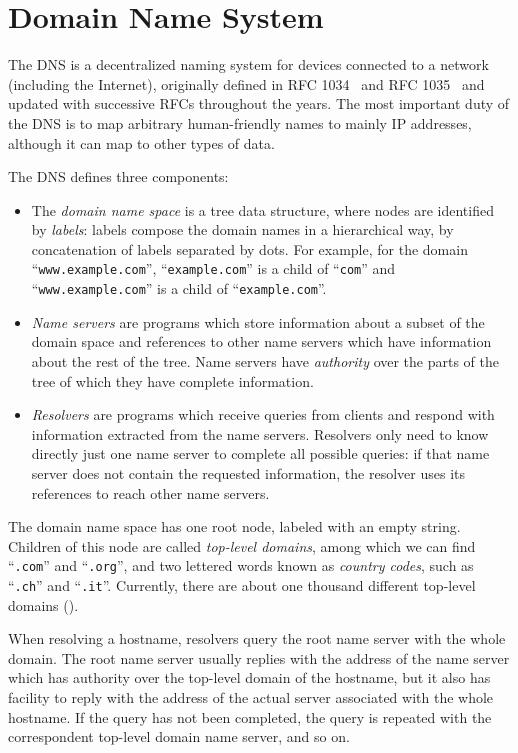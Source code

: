 \documentclass[mscthesis]{usiinfthesis}
\begin{document}
\section{Domain Name System}

The DNS is a decentralized naming system for devices connected to a network (including the Internet), originally defined in RFC 1034~\cite{rfc:1034} and RFC 1035~\cite{rfc:1035} and updated with successive RFCs throughout the years. The most important duty of the DNS is to map arbitrary human-friendly names to mainly IP addresses, although it can map to other types of data.

The DNS defines three components:
\begin{itemize}
	\item The \emph{domain name space} is a tree data structure, where nodes are identified by \emph{labels}: labels compose the domain names in a hierarchical way, by concatenation of labels separated by dots. For example, for the domain ``\texttt{www.example.com}'', ``\texttt{example.com}'' is a child of ``\texttt{com}'' and ``\texttt{www.example.com}'' is a child of ``\texttt{example.com}''.
	\item \emph{Name servers} are programs which store information about a subset of the domain space and references to other name servers which have information about the rest of the tree. Name servers have \emph{authority} over the parts of the tree of which they have complete information.
	\item \emph{Resolvers} are programs which receive queries from clients and respond with information extracted from the name servers. Resolvers only need to know directly just one name server to complete all possible queries: if that name server does not contain the requested information, the resolver uses its references to reach other name servers.
\end{itemize}
The domain name space has one root node, labeled with an empty string. Children of this node are called \emph{top-level domains}, among which we can find ``\texttt{.com}'' and ``\texttt{.org}'', and two lettered words known as \emph{country codes}, such as ``\texttt{.ch}'' and ``\texttt{.it}''. Currently, there are about one thousand different top-level domains (\cite{website:tldlist}).

When resolving a hostname, resolvers query the root name server with the whole domain. The root name server usually replies with the address of the name server which has authority over the top-level domain of the hostname, but it also has facility to reply with the address of the actual server associated with the whole hostname. If the query has not been completed, the query is repeated with the correspondent top-level domain name server, and so on.
\end{document}

